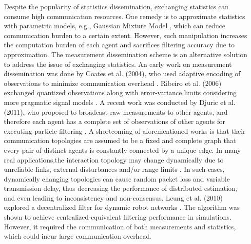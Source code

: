 	
	Despite the popularity of statistics dissemination, exchanging statistics can consume high communication resources. 
	One remedy is to approximate statistics with parametric models, e.g., Gaussian Mixture Model \cite{sheng2005distributed}, which can reduce communication burden to a certain extent. 
	However, such manipulation increases the computation burden of each agent and sacrifices filtering  accuracy due to approximation.
	The measurement dissemination scheme is an alternative solution to address the issue of exchanging statistics. 
	An early work on measurement dissemination was done by Coates et al. (2004), who used adaptive encoding of observations to minimize communication overhead \cite{coates2004distributed}. Ribeiro et al. (2006) exchanged quantized observations along with error-variance limits considering more pragmatic signal models \cite{ribeiro2006bandwidth}.
	A recent work was conducted by Djuric et al. (2011), who proposed to broadcast raw measurements to other agents, and therefore each agent has a complete set of observations of other agents for executing particle filtering \cite{djuric2011non}.  
	A shortcoming of aforementioned works is that their communication topologies are assumed to be a fixed and complete graph that every pair of distinct agents is constantly connected by a unique edge. 
	In many real applications,the  interaction topology may change dynamically due to unreliable links, external disturbances and/or range limits \cite{xiao2008asynchronous}.
	In such cases, dynamically changing topologies can cause random packet loss and variable transmission delay, thus decreasing the performance of distributed estimation, and even leading to inconsistency and non-consensus. 
	Leung et al. (2010) explored a decentralized filter for dynamic robot networks \cite{leung2010decentralized}.
	The algorithm was shown to achieve centralized-equivalent filtering performance in simulations. 
	However, it required the communication of both measurements and statistics, which could incur large communication overhead.
		
